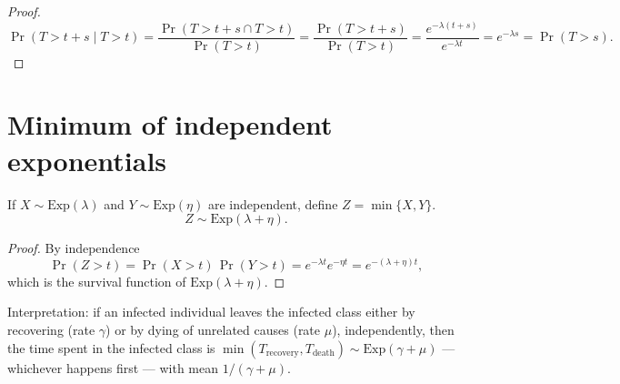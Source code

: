 \begin{proof}
\[
\Pr(T> t+s\mid T> t) = \frac{\Pr(T> t+s \cap T > t)}{\Pr(T > t)} = \frac{\Pr(T> t+s)}{\Pr(T> t)} = \frac{e^{-\lambda(t+s)}}{e^{-\lambda t}} = e^{-\lambda s} = \Pr(T> s).
\]
\end{proof}

\section{Minimum of independent exponentials}

\begin{proposition}
  If $X\sim\text{Exp}(\lambda)$ and $Y\sim\text{Exp}(\eta)$ are
  independent, define $Z=\min\{X,Y\}$.
\[
Z\sim\text{Exp}(\lambda+\eta).
\]
\end{proposition}

\begin{proof}
By independence
\[
\Pr(Z>t) = \Pr(X>t)\,\Pr(Y>t) = e^{-\lambda t}e^{-\eta t} = e^{-(\lambda+\eta)t},
\]
which is the survival function of $\text{Exp}(\lambda+\eta)$.
\end{proof}

Interpretation: if an infected individual leaves the infected class
either by recovering (rate $\gamma$) or by dying of unrelated causes
(rate $\mu$), independently, then the time spent in the infected class
is $\min(T_{\text{recovery}}, T_{\text{death}})\sim\text{Exp}(\gamma+\mu)$
--- whichever happens first --- with mean $1/(\gamma+\mu)$.
